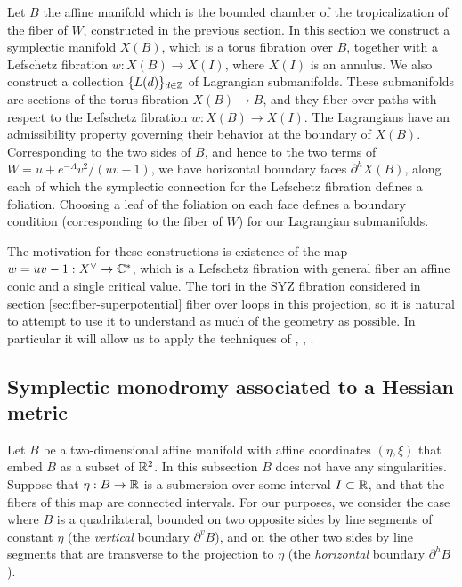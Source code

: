 \documentclass[12pt]{amsart}
\begin{document}
Let $B$ the affine manifold which is the bounded chamber of the
tropicalization of the fiber of $W$, constructed in the previous
section. In this section we construct a symplectic manifold $X(B)$,
which is a torus fibration over $B$, together with a Lefschetz
fibration $w: X(B) \to X(I)$, where $X(I)$ is an annulus. We also
construct a collection $\{L(d)\}_{d\in \mathbb{Z}}$ of Lagrangian
submanifolds. These submanifolds are sections of the torus fibration
$X(B) \to B$, and they fiber over paths with respect to the Lefschetz
fibration $w: X(B)\to X(I)$. The Lagrangians have an admissibility
property governing their behavior at the boundary of
$X(B)$. Corresponding to the two sides of $B$, and hence to the two
terms of $W = u + e^{-\Lambda}v^2/(uv-1)$, we have horizontal boundary
faces $\partial^h X(B)$, along each of which the symplectic connection
for the Lefschetz fibration defines a foliation. Choosing a leaf of
the foliation on each face defines a boundary condition (corresponding
to the fiber of $W$) for our Lagrangian submanifolds.

The motivation for these constructions is existence of the map
$w = uv-1: X^\vee \to \mathbb{C}^*$, which is a Lefschetz fibration with
general fiber an affine conic and a single critical value. The tori in
the SYZ fibration considered in section \ref{sec:fiber-superpotential}
fiber over loops in this projection, so it is natural to attempt to
use it to understand as much of the geometry as possible. In
particular it will allow us to apply the techniques of
\cite{seidel-book}, \cite{seidel01a}, \cite{seidel01b}.

\subsection{Symplectic monodromy associated to a Hessian metric}
\label{sec:monodromy-hessian}

Let $B$ be a two-dimensional affine manifold with affine coordinates
$(\eta,\xi)$ that embed $B$ as a subset of $\mathbb{R}^2$. In this subsection
$B$ does not have any singularities. Suppose that $\eta: B \to \mathbb{R}$ is
a submersion over some interval $I \subset \mathbb{R}$, and that the fibers of
this map are connected intervals. For our purposes, we consider the
case where $B$ is a quadrilateral, bounded on two opposite sides by
line segments of constant $\eta$ (the \emph{vertical} boundary
$\partial^v B$), and on the other two sides by line segments that are
transverse to the projection to $\eta$ (the \emph{horizontal} boundary
$\partial^h B$).
\end{document}
